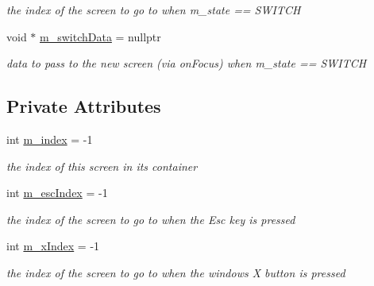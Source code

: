 \begin{DoxyCompactItemize}
\begin{DoxyCompactList}\small\item\em the index of the screen to go to when m\+\_\+state == S\+W\+I\+T\+CH \end{DoxyCompactList}\item 
\mbox{\label{classnta_1_1Screen_aa72901053a8b965ac8c439ebd23efb56}} 
void $\ast$ \hyperlink{classnta_1_1Screen_aa72901053a8b965ac8c439ebd23efb56}{m\+\_\+switch\+Data} = nullptr
\begin{DoxyCompactList}\small\item\em data to pass to the new screen (via on\+Focus) when m\+\_\+state == S\+W\+I\+T\+CH \end{DoxyCompactList}\end{DoxyCompactItemize}
\subsection*{Private Attributes}
\begin{DoxyCompactItemize}
\item 
\mbox{\label{classnta_1_1Screen_a60c7a5b3894ec6f42042dac0f1f3c54c}} 
int \hyperlink{classnta_1_1Screen_a60c7a5b3894ec6f42042dac0f1f3c54c}{m\+\_\+index} = -\/1
\begin{DoxyCompactList}\small\item\em the index of this screen in its container \end{DoxyCompactList}\item 
\mbox{\label{classnta_1_1Screen_a5e38ecb4efb8ea6487774052f9d3281d}} 
int \hyperlink{classnta_1_1Screen_a5e38ecb4efb8ea6487774052f9d3281d}{m\+\_\+esc\+Index} = -\/1
\begin{DoxyCompactList}\small\item\em the index of the screen to go to when the Esc key is pressed \end{DoxyCompactList}\item 
\mbox{\label{classnta_1_1Screen_afba24e281f497022a32416f707785b9c}} 
int \hyperlink{classnta_1_1Screen_afba24e281f497022a32416f707785b9c}{m\+\_\+x\+Index} = -\/1
\begin{DoxyCompactList}\small\item\em the index of the screen to go to when the window\textquotesingle{}s X button is pressed \end{DoxyCompactList}\end{DoxyCompactItemize}


